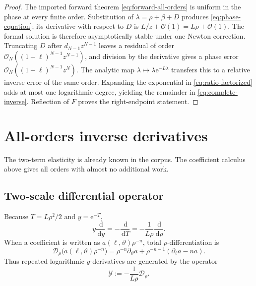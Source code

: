 \documentclass[11pt,oneside]{article}
\numberwithin{equation}{section}
\theoremstyle{definition}
\theoremstyle{remark}
\newcommand{\e}{\mathrm e}
\newcommand{\dd}{\,\mathrm d}
\newcommand{\bigO}{\mathcal O}
\newcommand{\phase}{\vartheta}
\begin{document}
\begin{proof}
The imported forward theorem \eqref{eq:forward-all-orders} is uniform in the
phase at every finite order.  Substitution of
$\lambda=\rho+\beta+D$ produces \eqref{eq:phase-equation}; its derivative with
respect to $D$ is $L/z+\bigO(1)=L\rho+\bigO(1)$.  The formal solution is
therefore asymptotically stable under one Newton correction.  Truncating $D$
after $d_{N-1}z^{N-1}$ leaves a residual of order
$\bigO_N((1+\ell)^{N-1}z^{N-1})$, and division by the derivative gives a phase
error $\bigO_N((1+\ell)^{N-1}z^N)$.  The analytic map
$\lambda\mapsto\lambda\e^{-L\lambda}$ transfers this to a relative inverse
error of the same order.  Expanding the exponential in
\eqref{eq:ratio-factorized} adds at most one logarithmic degree, yielding the
remainder in \eqref{eq:complete-inverse}.  Reflection of $F$ proves the
right-endpoint statement.
\end{proof}

\section{All-orders inverse derivatives}
\label{sec:inverse-derivatives}

The two-term elasticity is already known in the corpus.  The coefficient
calculus above gives all orders with almost no additional work.

\subsection{Two-scale differential operator}

Because $T=L\rho^2/2$ and $y=\e^{-T}$,
\begin{equation}
 y\frac{\dd}{\dd y}
 =-\frac{\dd}{\dd T}
 =-\frac1{L\rho}\frac{\dd}{\dd\rho}.
 \label{eq:y-derivative}
\end{equation}
When a coefficient is written as $a(\ell,\phase)\rho^{-n}$, total
$\rho$-differentiation is
\begin{equation}
 \mathscr D_\rho\bigl(a(\ell,\phase)\rho^{-n}\bigr)
 =\rho^{-n}\partial_\phase a
 +\rho^{-n-1}(\partial_\ell a-na).
 \label{eq:two-scale-D}
\end{equation}
Thus repeated logarithmic $y$-derivatives are generated by the operator
\begin{equation}
 \mathscr Y:=-\frac1{L\rho}\mathscr D_\rho.
 \label{eq:Y-operator}
\end{equation}
\end{document}
